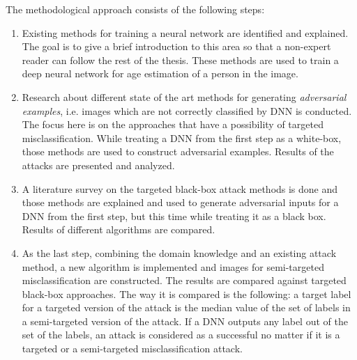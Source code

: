 The methodological approach consists of the following steps:
\begin{enumerate}
    \item Existing methods for training a neural network are identified and explained. The goal is to give a brief introduction to this area so that a non-expert reader can follow the rest of the thesis. These methods are used to train a deep neural network for age estimation of a person in the image.
    
    \item Research about different state of the art methods for generating \textit{adversarial examples}, i.e. images which are not correctly classified by DNN is conducted. The focus here is on the approaches that have a possibility of targeted misclassification. While treating a DNN from the first step as a white-box, those methods are used to construct adversarial examples. Results of the attacks are presented and analyzed.
    
    \item A literature survey on the targeted black-box attack methods is done and those methods are explained and used to generate adversarial inputs for a DNN  from the first step, but this time while treating it as a black box. Results of different algorithms are compared. 
    
    \item As the last step, combining the domain knowledge and an existing attack method, a new algorithm is implemented and images for semi-targeted misclassification are constructed. The results are compared against targeted black-box approaches. The way it is compared is the following: a target label for a targeted version of the attack is the median value of the set of labels in a semi-targeted version of the attack. If a DNN outputs any label out of the set of the labels, an attack is  considered as a successful no matter if it is a targeted or a semi-targeted misclassification attack.
\end{enumerate}
